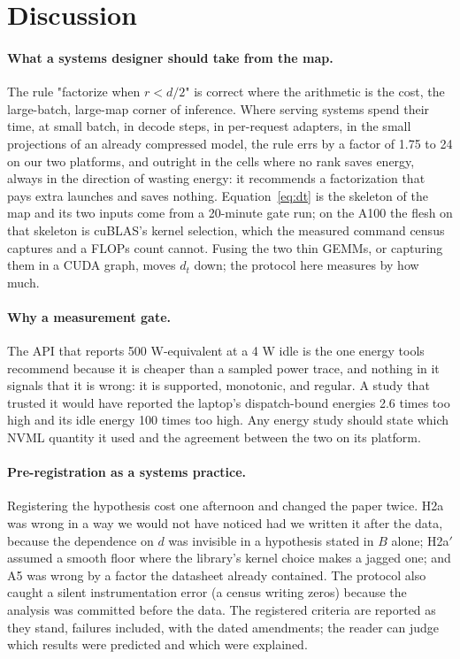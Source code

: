 \documentclass{article}
\begin{document}
\section{Discussion}
\label{sec:discussion}

\paragraph{What a systems designer should take from the map.} The rule "factorize when $r < d/2$" is correct where the arithmetic is the cost, the large-batch, large-map corner of inference. Where serving systems spend their time, at small batch, in decode steps, in per-request adapters, in the small projections of an already compressed model, the rule errs by a factor of 1.75 to 24 on our two platforms, and outright in the cells where no rank saves energy, always in the direction of wasting energy: it recommends a factorization that pays extra launches and saves nothing. Equation~\ref{eq:dt} is the skeleton of the map and its two inputs come from a 20-minute gate run; on the A100 the flesh on that skeleton is cuBLAS's kernel selection, which the measured command census captures and a FLOPs count cannot. Fusing the two thin GEMMs, or capturing them in a CUDA graph, moves $d_t$ down; the protocol here measures by how much.

\paragraph{Why a measurement gate.} The API that reports 500 W-equivalent at a 4 W idle is the one energy tools recommend because it is cheaper than a sampled power trace, and nothing in it signals that it is wrong: it is supported, monotonic, and regular. A study that trusted it would have reported the laptop's dispatch-bound energies 2.6 times too high and its idle energy 100 times too high. Any energy study should state which NVML quantity it used and the agreement between the two on its platform.

\paragraph{Pre-registration as a systems practice.} Registering the hypothesis cost one afternoon and changed the paper twice. H2a was wrong in a way we would not have noticed had we written it after the data, because the dependence on $d$ was invisible in a hypothesis stated in $B$ alone; H2a$'$ assumed a smooth floor where the library's kernel choice makes a jagged one; and A5 was wrong by a factor the datasheet already contained. The protocol also caught a silent instrumentation error (a census writing zeros) because the analysis was committed before the data. The registered criteria are reported as they stand, failures included, with the dated amendments; the reader can judge which results were predicted and which were explained.
\end{document}
